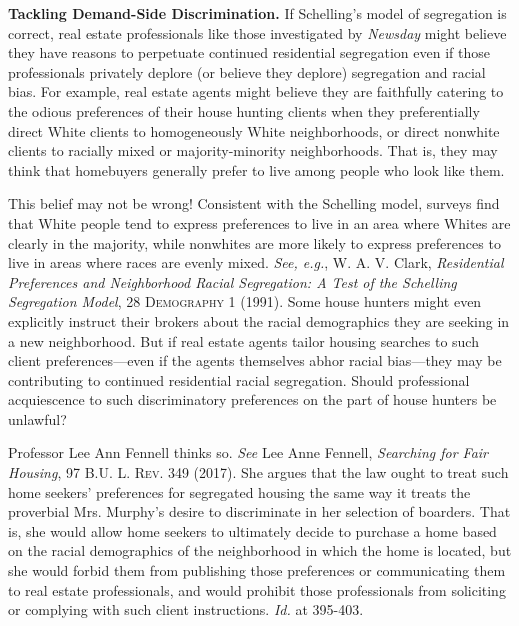 \begin{questions}[]
\item \textbf{Tackling Demand-Side Discrimination.} If Schelling's model of
segregation is correct, real estate professionals like those investigated by
\textit{Newsday} might believe they have reasons to perpetuate continued
residential segregation even if those professionals privately deplore (or
believe they deplore) segregation and racial bias. For example, real estate
agents might believe they are faithfully catering to the odious preferences of
their house hunting clients when they preferentially direct White clients to
homogeneously White neighborhoods, or direct nonwhite clients to racially mixed
or majority-minority neighborhoods. That is, they may think that homebuyers
generally prefer to live among people who look like them. 

This belief may not be wrong! Consistent with the Schelling model, surveys find
that White people tend to express preferences to live in an area where Whites
are clearly in the majority, while nonwhites are more likely to express
preferences to live in areas where races are evenly mixed.  \textit{See, e.g.},
W. A. V. Clark, \textit{Residential Preferences and Neighborhood Racial
Segregation: A Test of the Schelling Segregation Model}, 28 \textsc{Demography}
1 (1991). Some house hunters might even explicitly instruct their brokers about
the racial demographics they are seeking in a new neighborhood. But if real
estate agents tailor housing searches to such client preferences---even if the
agents themselves abhor racial bias---they may be contributing to continued
residential racial segregation. Should professional acquiescence to such
discriminatory preferences on the part of house hunters be unlawful?

Professor Lee Ann Fennell thinks so. \textit{See} Lee Anne Fennell,
\textit{Searching for Fair Housing}, 97 \textsc{B.U. L. Rev}. 349 (2017). She
argues that the law ought to treat such home seekers' preferences for
segregated housing the same way it treats the proverbial Mrs. Murphy's desire
to discriminate in her selection of boarders. That is, she would allow home seekers to ultimately
decide to
purchase a home based on the racial demographics of the neighborhood in which
the home is located, but she would forbid them from publishing those
preferences or communicating them to real estate professionals, and would
prohibit those professionals from soliciting or complying with such client
instructions. \textit{Id.} at 395-403. 


\end{questions}

